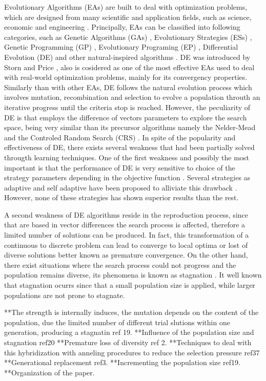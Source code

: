Evolutionary Algorithms (EAs) are built to deal with optimization problems, which are designed from many scientific and application fields, such as science, economic and engineering \cite{noman2008differential, chakraborty2008advances}.
%
Principally, EAs can be classified into following categories, such as Genetic Algorithms (GAs) \cite{srinivas1994genetic, schwefel1977numerische} , Evolutionary Strategies (ESs) \cite{john1992holland}, Genetic Programming (GP) \cite{koza1992genetic}, Evolutionary Programing (EP) \cite{fogel1991meta}, Differential Evolution (DE) \cite{storn1997differential} and other natural-inspired algorithms \cite{das2011differential}.
%
%
DE was introduced by Storn and Price \cite{storn1997differential}, also is cosidered as one of the most effective EAs used to deal with real-world optimization problems, mainly for its convergency properties.
%
Similarly than with other EAs, DE follows the natural evolution process which involves mutation, recombination and selection to evolve a population throuth an iterative progress until the criteria stop is reached.
%
However, the peculiarity of DE is that employs the difference of vectors parameters to explore the search space, being very similar than its precursor algorithms namely the Nelder-Mead \cite{nelder1965simplex} and the Controled Random Search (CRS) \cite{price1983global}.
%
In spite of the popularity and effectiveness of DE, there exists several weakness that had been partially solved througth learning techniques.
%
One of the first weakness and possibly the most important is that the performance of DE is very sensitive to choice of the strategy parameters depending in the objective function \cite{gamperle2002parameter}.
%
Several strategies as adaptive and self adaptive have been proposed to alliviate this drawback \cite{brest2006self, zhang2009jade}.
%
However, none of these strategies has shown superior results than the rest.
%

A second weakness of DE algorithms reside in the reproduction process, since that are based in vector differences the search process is affected, therefore a limited number of solutions can be produced.
%
In fact, this transformation of a continuous to discrete problem can lead to converge to local optima or lost of diverse solutions better known as premature convergence.
%
On the other hand, there exist situations where the search process could not progress and the population remains diverse, its phenomena is known as stagnation \cite{lampinen2000stagnation}.
%
It well known that stagnation ocurrs since that a small population size is applied, while larger populations are not prone to stagnate.

%



**The strength is internally induces, the mutation depends  on the content of the population, due the limited number of different trial slutions within one generation, producing a stagnatin ref 19.
**Influence of the population size and stagnation ref20
**Premature loss of diversity ref 2.
   **Techniques to deal with this hybridization with anneling procedures to reduce the selection pressure ref37
   **Generational replacement ref3.
   **Incrementing the population size ref19.
**Organization of the paper.
